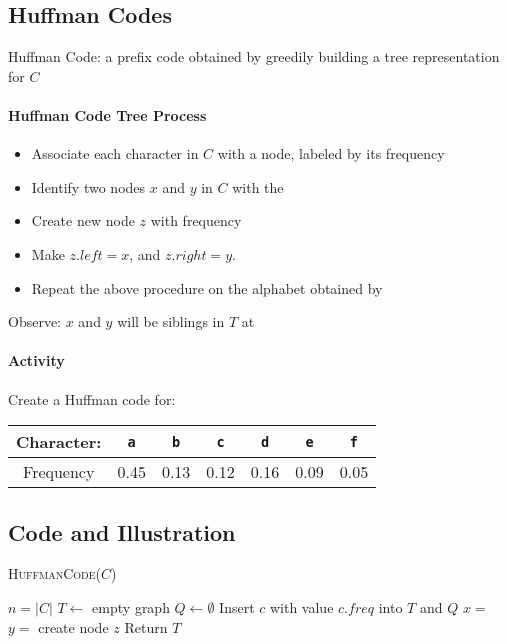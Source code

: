 \documentclass[11  pt]{article}
\newcommand{\tta}{\tt{a}}
\newcommand{\ttb}{\tt{b}}
\newcommand{\ttc}{\tt{c}}
\newcommand{\tte}{\tt{e}}
\newcommand{\ttd}{\tt{d}}
\newcommand{\ttf}{\tt{f}}
\begin{document}
\newpage

\subsection{Huffman Codes}
Huffman Code: a prefix code obtained by greedily building a tree representation for $C$


\paragraph{Huffman Code Tree Process}
\begin{itemize}
	\item Associate each character in $C$ with a node, labeled by its frequency
	\item Identify two nodes $x$ and $y$ in $C$ with the 
	\item Create new node $z$ with frequency 
	\item Make $z.left = x$, and $z.right = y$.
	\item Repeat the above procedure on the alphabet obtained by \\
\end{itemize}
Observe: $x$ and $y$ will be siblings in $T$ at 
\paragraph{Activity} Create a Huffman code for:
\begin{tabular}{c c c c c c c}
	Character: &  \tta & \ttb & \ttc & \ttd & \tte & \ttf \\
	\hline
	Frequency & 0.45 & 0.13 & 0.12 & 0.16 & 0.09 & 0.05 
\end{tabular} 

\newpage

\subsection{Code and Illustration}
\begin{algorithm}[t]
	\textsc{HuffmanCode}($C$)
	\begin{algorithmic}
		\State $n =|C|$
		\State $T \leftarrow$ empty graph 
		\State $Q \leftarrow \emptyset$ 
		\State Insert $c$ with value $c.freq$ into $T$ and $Q$
		\EndFor
		\State $x = $ %
		\State $y = $ %
		\State create node $z$
		\State 
		\State 
		\State 
		\State
		\State 
		\State
		\State 
		\EndFor
		\State Return $T$
	\end{algorithmic}
\end{algorithm}
\newpage
\end{document}
